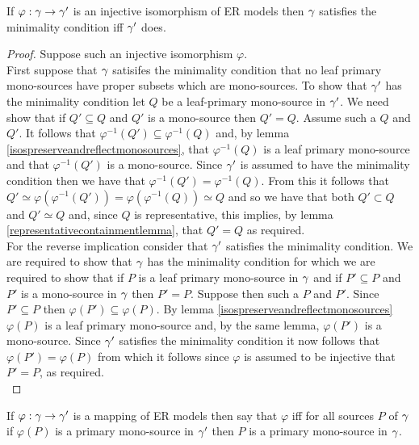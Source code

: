 \begin{lemma}
If $\varphi: \gamma \rightarrow \gamma'$ is an injective isomorphism of ER models then $\gamma$ satisfies the minimality condition iff $\gamma'$ does.
\end{lemma}
\begin{proof}
Suppose such an injective isomorphism $\varphi$. \\

First suppose that $\gamma$ satisifes the minimality condition that no leaf primary mono-sources have proper subsets which are mono-sources. 
To show that $\gamma'$ has the minimality condition let $Q$ be a leaf-primary mono-source in $\gamma'$. We need show that if $Q' \subseteq Q$ and $Q'$ is a mono-source then $Q'=Q$. Assume such a $Q$ and $Q'$. It follows that $\varphi^{-1}(Q') \subseteq \varphi^{-1} (Q)$ and, by lemma \ref{isospreserveandreflectmonosources}, that $\varphi^{-1}(Q)$
is a leaf primary mono-source and that $\varphi^{-1}(Q')$ is a mono-source. Since $\gamma'$ is assumed to have the minimality condition then we have that
$\varphi^{-1}(Q') = \varphi^{-1} (Q)$. From this it follows that  $Q' \simeq \varphi(\varphi^{-1}(Q')) = \varphi(\varphi^{-1}(Q)) \simeq Q$ and so we have that both $Q' \subset Q$ and $Q' \simeq Q$ and, since $Q$ is representative, this implies, by lemma \ref{representativecontainmentlemma}, that $Q'=Q$ as required. \\

For the reverse implication consider that $\gamma'$ satisfies the minimality condition. We are required to show that $\gamma$ has the minimality condition for which we are required to show that if  $P$ is a leaf primary mono-source in $\gamma$ and if $P' \subseteq P$ and 
 $P'$ is a mono-source in $\gamma$ then $P'=P$.  Suppose then such a $P$ and $P'$. Since $P' \subseteq P$ then $\varphi(P') \subseteq \varphi(P)$. 
By lemma \ref{isospreserveandreflectmonosources} $\varphi(P)$ is a leaf primary mono-source and, by the same lemma,  $\varphi(P')$ is a mono-source.
Since $\gamma'$ satisfies the minimality condition it now follows that $\varphi(P') = \varphi(P)$ from which  it follows since $\varphi$ is assumed to be injective
that $P'=P$, as required.\\
\end{proof}

\begin{definition}
If $\varphi: \gamma \rightarrow \gamma'$ is a mapping of ER models then
say that $\varphi$  
iff for all sources $P$ of  $\gamma$ if
$\varphi(P)$ is a primary mono-source in $\gamma'$ then $P$ is a primary mono-source in $\gamma$.
\end{definition}

